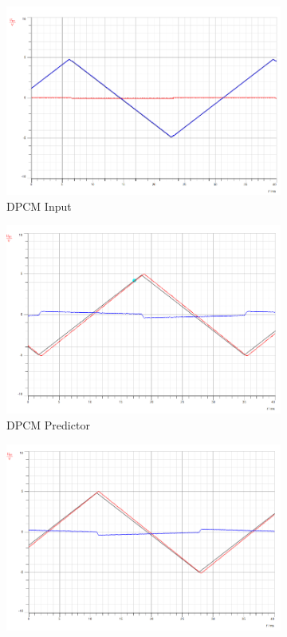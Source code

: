 \documentclass[12pt]{article}
\begin{document}
\begin{figure}[H]
    \begin{subfigure}[b]{0.32\textwidth}
        \centering
        \includegraphics[width=\textwidth]{assets/main/2023-08-26-23-15-46.png}
        \caption{DPCM Input}
    \end{subfigure}
    \begin{subfigure}[b]{0.32\textwidth}
        \centering
        \includegraphics[width=\textwidth]{assets/main/2023-08-26-23-16-03.png}
        \caption{DPCM Predictor}
    \end{subfigure}
    \begin{subfigure}[b]{0.32\textwidth}
        \centering
        \includegraphics[width=\textwidth]{assets/main/2023-08-26-23-16-27.png}

\end{subfigure}
\end{figure}
\end{document}
